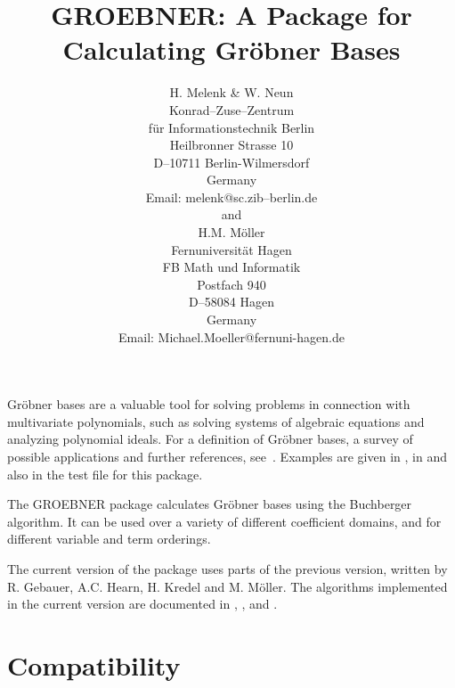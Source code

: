 \title{GROEBNER: A Package for Calculating Gr\"obner Bases}
\date{}
\author{
H. Melenk \& W. Neun \\[0.05in]
Konrad--Zuse--Zentrum \\
f\"ur Informationstechnik Berlin \\
Heilbronner Strasse 10 \\
D--10711 Berlin-Wilmersdorf \\
Germany \\[0.05in]
Email:  melenk@sc.zib--berlin.de \\[0.05in]
and \\[0.05in]
H.M. M\"oller \\[0.05in]
Fernuniversit\"at Hagen \\
FB Math und Informatik\\
Postfach 940 \\
D--58084 Hagen \\
Germany\\[0.05in]
Email: Michael.Moeller@fernuni-hagen.de}


\maketitle

Gr\"obner bases are a valuable tool for solving problems in
connection with multivariate polynomials, such as solving systems of
algebraic equations and analyzing polynomial ideals. For a definition
of Gr\"obner bases, a survey of possible applications and further
references, see~\cite{Buchberger:85}. Examples are given in \cite{Boege:86},
in \cite{Buchberger:88} and also in the test file for this package.

 
The GROEBNER package calculates Gr\"obner bases using the
Buchberger algorithm.  It can be used over a variety of different
coefficient domains, and for different variable and term orderings.

The current version of the package uses parts of the previous
version, written by  R. Gebauer, A.C. Hearn, H. Kredel and M.
M\"oller. The algorithms implemented in the current version are
documented in \cite{Faugere:89}, \cite{Gebauer:88},
\cite{Kredel:88a} and \cite{Giovini:91}.

\section{Compatibility}

